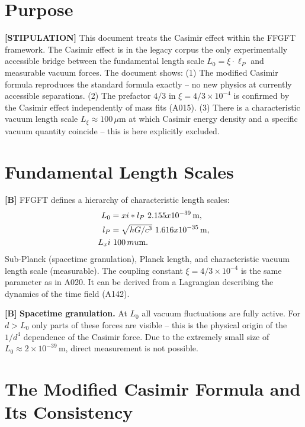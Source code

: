 \section{Purpose}

\textbf{[STIPULATION]} This document treats the Casimir effect within the FFGFT
framework. The Casimir effect is in the legacy corpus the only experimentally
accessible bridge between the fundamental length scale $L_0=\xi\cdot\ell_P$ and
measurable vacuum forces. The document shows: (1) The modified Casimir formula
reproduces the standard formula exactly -- no new physics at currently accessible
separations. (2) The prefactor $4/3$ in $\xi=4/3\times10^{-4}$ is confirmed by
the Casimir effect independently of mass fits (A015). (3) There is a
characteristic vacuum length scale $L_\xi\approx100\,\mu\text{m}$ at which
Casimir energy density and a specific vacuum quantity coincide -- this is here
explicitly excluded.

\section{Fundamental Length Scales}

\textbf{[B]} FFGFT defines a hierarchy of characteristic length scales:
\begin{align}
  L_0    &= \xi\cdot\ell_P \approx 2{.}155\times10^{-39}\,\text{m}, \notag\\
  \ell_P &= \sqrt{\hbar G/c^3} \approx 1{.}616\times10^{-35}\,\text{m}, \notag\\
  L_\xi  &\approx 100\,\mu\text{m}. \notag
\end{align}
Sub-Planck (spacetime granulation), Planck length,
and characteristic vacuum length scale (measurable).
The coupling constant $\xi=4/3\times10^{-4}$ is the same parameter as in A020.
It can be derived from a Lagrangian describing the dynamics of the time field (A142).

\textbf{[B]} \textbf{Spacetime granulation.} At $L_0$ all vacuum fluctuations are
fully active. For $d>L_0$ only parts of these forces are visible -- this is the
physical origin of the $1/d^4$ dependence of the Casimir force. Due to the
extremely small size of $L_0\approx2\times10^{-39}\,\text{m}$, direct measurement
is not possible.

\section{The Modified Casimir Formula and Its Consistency}

